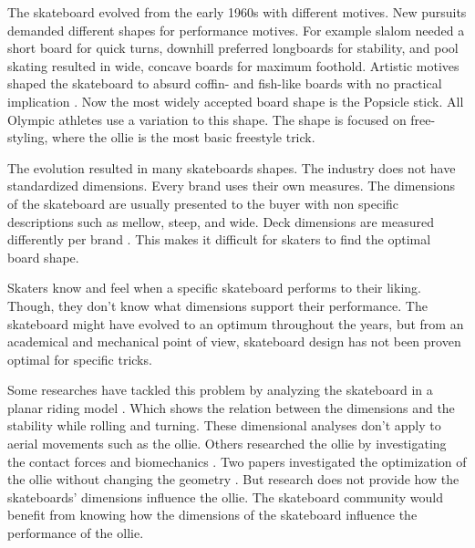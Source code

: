 \documentclass[default,iicol]{sn-jnl}
\begin{document}
The skateboard evolved from the early 1960s with different motives. New
pursuits demanded different shapes for performance motives. For example slalom
needed a short board for quick turns, downhill preferred longboards for
stability, and pool skating resulted in wide, concave boards for maximum
foothold. Artistic motives shaped the skateboard to absurd coffin- and
fish-like boards with no practical implication \cite{prentiss_get_2011}. Now
the most widely accepted board shape is the Popsicle stick. All Olympic
athletes use a variation to this shape. The shape is focused on free-styling,
where the ollie is the most basic freestyle trick.

The evolution resulted in many skateboards shapes. The industry does not have
standardized dimensions. Every brand uses their own
measures\cite{berger_handmade_2021}. The dimensions of the skateboard are
usually presented to the buyer with non specific descriptions such as mellow,
steep, and wide. Deck dimensions are measured differently per brand
\cite{johnny_skateboarding_2013}. This makes it difficult for skaters to find
the optimal board shape.

Skaters know and feel when a specific skateboard performs to their liking.
Though, they don’t know what dimensions support their performance. The
skateboard might have evolved to an optimum throughout the years, but from an
academical and mechanical point of view, skateboard design has not been proven
optimal for specific tricks.

Some researches have tackled this problem by analyzing the skateboard in a
planar riding model
\cite{hubbard_lateral_1979,hubbard_human_1980,kremnev_nonlinear_2010,ispolov_skateboard_1996,rosatello_skateboard_2015,varszegi_stability_2017,varszegi_stabilizing_2016,varszegi_downhill_2016,varszegi_balancing_2014,kuleshov_mathematical_2007,kuleshov_various_2010}.
Which shows the relation between the dimensions and the stability while rolling
and turning. These dimensional analyses don't apply to aerial movements such as
the ollie. Others researched the ollie by investigating the contact forces
\cite{anderson_ollie_2020,shield_contact-implicit_2022} and biomechanics
\cite{frederick_biomechanics_2006,vorlicek_analysis_2015,wood_3d_2020,nakashima_simulation_2021,nevitt_ground_2006,candotti_lower_2012,dias_using_2016,anderson_ollie_2020,bridgman_human_1992,ou_postural_2021}.
Two papers investigated the optimization of the ollie without changing the
geometry \cite{anderson_ollie_2020,shield_contact-implicit_2022}. But research
does not provide how the skateboards' dimensions influence the ollie. The
skateboard community would benefit from knowing how the dimensions of the
skateboard influence the performance of the ollie.
\end{document}
